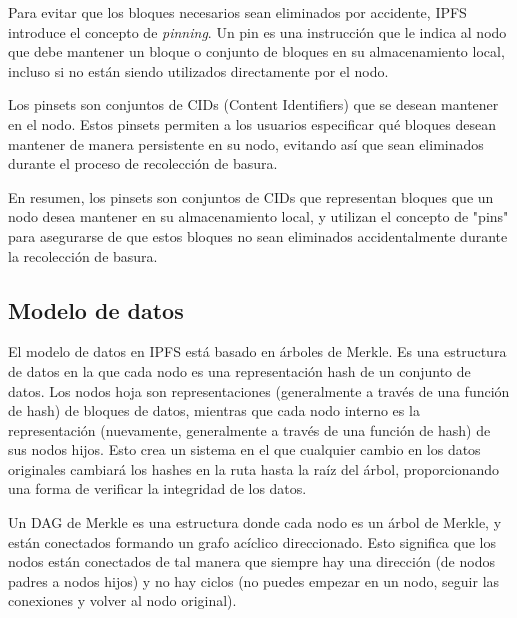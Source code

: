 Para evitar que los bloques necesarios sean eliminados por accidente, IPFS introduce el concepto de \textit{pinning}. Un pin es una
instrucción que le indica al nodo que debe mantener un bloque o conjunto de bloques en su almacenamiento local, incluso si no están
siendo utilizados directamente por el nodo.

Los pinsets son conjuntos de CIDs (Content Identifiers) que se desean mantener en el nodo. Estos pinsets permiten a los usuarios
especificar qué bloques desean mantener de manera persistente en su nodo, evitando así que sean eliminados durante el proceso de
recolección de basura.

En resumen, los pinsets son conjuntos de CIDs que representan bloques que un nodo desea mantener en su almacenamiento local, y utilizan el concepto de "pins" para asegurarse de que estos bloques no sean eliminados accidentalmente durante la recolección de basura.

\subsection{Modelo de datos}

El modelo de datos en IPFS está basado en árboles de Merkle. Es una estructura de datos en la que cada nodo es una representación hash de un conjunto de datos.
Los nodos hoja son representaciones (generalmente a través de una función de hash) de bloques de datos, mientras que cada nodo interno es la representación
(nuevamente, generalmente a través de una función de hash) de sus nodos hijos. Esto crea un sistema en el que cualquier cambio en los datos originales cambiará
los hashes en la ruta hasta la raíz del árbol, proporcionando una forma de verificar la integridad de los datos.

Un DAG de Merkle es una estructura donde cada nodo es un árbol de Merkle, y están conectados formando un grafo acíclico direccionado.
Esto significa que los nodos están conectados de tal manera que siempre hay una dirección (de nodos padres a nodos hijos) y no hay ciclos (no puedes empezar en un nodo, seguir las conexiones y volver al nodo original).

